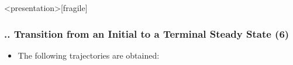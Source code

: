 \documentclass[11pt,aspectratio=169]{beamer}
\begin{document}
\begin{frame}<presentation>[fragile]
	\frametitle{{\thesection.\thesubsection.\thesubsubsection} Transition from an Initial to a Terminal Steady State (6)}
	\begin{itemize}
		\item The following trajectories are obtained:
		\begin{figure}
			\centering
			\qquad
			\qquad
		\end{figure}
	\end{itemize}
\end{frame}
\end{document}
